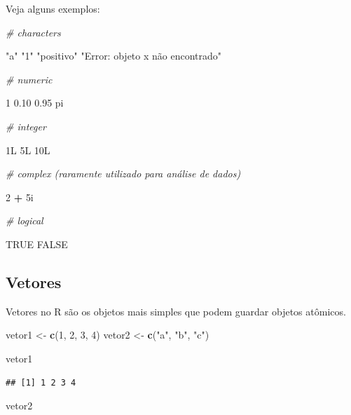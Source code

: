\documentclass[
]{book}
\newenvironment{Shaded}{\begin{snugshade}}{\end{snugshade}}
\newcommand{\CommentTok}[1]{\textcolor[rgb]{0.56,0.35,0.01}{\textit{#1}}}
\newcommand{\DecValTok}[1]{\textcolor[rgb]{0.00,0.00,0.81}{#1}}
\newcommand{\FloatTok}[1]{\textcolor[rgb]{0.00,0.00,0.81}{#1}}
\newcommand{\KeywordTok}[1]{\textcolor[rgb]{0.13,0.29,0.53}{\textbf{#1}}}
\newcommand{\NormalTok}[1]{#1}
\newcommand{\OperatorTok}[1]{\textcolor[rgb]{0.81,0.36,0.00}{\textbf{#1}}}
\newcommand{\OtherTok}[1]{\textcolor[rgb]{0.56,0.35,0.01}{#1}}
\newcommand{\StringTok}[1]{\textcolor[rgb]{0.31,0.60,0.02}{#1}}
\begin{document}
Veja alguns exemplos:

\begin{Shaded}
\begin{Highlighting}[]
\CommentTok{\# characters}

\StringTok{"a"}
\StringTok{"1"}
\StringTok{"positivo"}
\StringTok{"Error: objeto x não encontrado"}

\CommentTok{\# numeric}

\DecValTok{1}
\FloatTok{0.10}
\FloatTok{0.95}
\NormalTok{pi}

\CommentTok{\# integer}

\NormalTok{1L}
\NormalTok{5L}
\NormalTok{10L}

\CommentTok{\# complex (raramente utilizado para análise de dados)}

\DecValTok{2} \OperatorTok{+}\StringTok{ }\NormalTok{5i}

\CommentTok{\# logical}

\OtherTok{TRUE}
\OtherTok{FALSE}
\end{Highlighting}
\end{Shaded}

\hypertarget{vetores}{%
\subsection{Vetores}\label{vetores}}

Vetores no R são os objetos mais simples que podem guardar objetos atômicos.

\begin{Shaded}
\begin{Highlighting}[]
\NormalTok{vetor1 <{-}}\StringTok{ }\KeywordTok{c}\NormalTok{(}\DecValTok{1}\NormalTok{, }\DecValTok{2}\NormalTok{, }\DecValTok{3}\NormalTok{, }\DecValTok{4}\NormalTok{)}
\NormalTok{vetor2 <{-}}\StringTok{ }\KeywordTok{c}\NormalTok{(}\StringTok{"a"}\NormalTok{, }\StringTok{"b"}\NormalTok{, }\StringTok{"c"}\NormalTok{)}

\NormalTok{vetor1}
\end{Highlighting}
\end{Shaded}

\begin{verbatim}
## [1] 1 2 3 4
\end{verbatim}

\begin{Shaded}
\begin{Highlighting}[]
\NormalTok{vetor2}
\end{Highlighting}
\end{Shaded}
\end{document}
